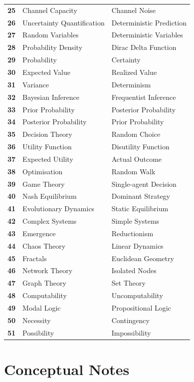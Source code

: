 \documentclass{article}
\begin{document}
\begin{table}[h]
\begin{tabular}{>{\bfseries}lll}
25 & Channel Capacity & Channel Noise \\
26 & Uncertainty Quantification & Deterministic Prediction \\
27 & Random Variables & Deterministic Variables \\
28 & Probability Density & Dirac Delta Function \\
29 & Probability & Certainty \\
30 & Expected Value & Realized Value \\
31 & Variance & Determinism \\
32 & Bayesian Inference & Frequentist Inference \\
33 & Prior Probability & Posterior Probability \\
34 & Posterior Probability & Prior Probability \\
35 & Decision Theory & Random Choice \\
36 & Utility Function & Disutility Function \\
37 & Expected Utility & Actual Outcome \\
38 & Optimisation & Random Walk \\
39 & Game Theory & Single-agent Decision \\
40 & Nash Equilibrium & Dominant Strategy \\
41 & Evolutionary Dynamics & Static Equilibrium \\
42 & Complex Systems & Simple Systems \\
43 & Emergence & Reductionism \\
44 & Chaos Theory & Linear Dynamics \\
45 & Fractals & Euclidean Geometry \\
46 & Network Theory & Isolated Nodes \\
47 & Graph Theory & Set Theory \\
48 & Computability & Uncomputability \\
49 & Modal Logic & Propositional Logic \\
50 & Necessity & Contingency \\
51 & Possibility & Impossibility \\
\bottomrule
\end{tabular}
\end{table}

\section*{Conceptual Notes}
\end{document}
